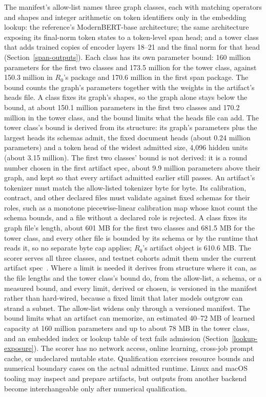 The manifest's allow-list names three graph classes, each with matching
operators and shapes and integer arithmetic on token identifiers only in the
embedding lookup: the reference's ModernBERT-base architecture; the same
architecture exposing its final-norm token states to a token-level span head;
and a tower class that adds trained copies of encoder layers 18--21 and the
final norm for that head (Section~\ref{span-outputs}). Each class has its own
parameter bound: 160 million parameters for the
first two classes and 173.5 million for the tower class, against 150.3 million
in \(R_0\)'s package and 170.6 million in the first span package. The bound
counts the graph's parameters together with the weights in the artifact's heads
file. A class fixes its graph's shapes, so the graph alone stays below the
bound, at about 150.1 million parameters in the first two classes and
170.2 million in the tower class, and the bound limits what the heads file can
add. The tower class's bound is derived from its structure: its graph's
parameters plus the largest heads its schemas admit, the fixed document heads
(about 0.24 million parameters) and a token head of the widest admitted size,
4,096 hidden units (about 3.15 million). The first two classes' bound is not
derived: it is a round number chosen in the first artifact spec, about
9.9 million parameters above their graph, and kept so that every artifact
admitted earlier still passes. An artifact's tokenizer
must match the allow-listed tokenizer byte for byte. Its calibration, contract,
and other declared files must validate against fixed schemas for their roles,
such as a monotone piecewise-linear calibration map whose knot count the schema
bounds, and a file without a declared role is rejected. A class fixes its graph
file's length, about 601 MB for the first two classes and 681.5 MB for the tower
class, and every other file is bounded by its schema or by the runtime that
reads it, so no separate byte cap applies; \(R_0\)'s artifact object is
610.6 MB. The scorer serves all three classes, and testnet cohorts admit them
under the current artifact spec~\cite{artifactspec}. Where a limit is needed it
derives from structure where it can, as the file lengths and the tower class's
bound do, from the allow-list, a schema, or a measured bound, and every limit,
derived or chosen, is versioned in the manifest rather than hard-wired, because
a fixed limit that later models outgrow can
strand a subnet. The allow-list widens only through a versioned manifest. The
bound limits what an artifact can memorize, an estimated 40--72 MB of learned
capacity at 160 million parameters and up to about 78 MB in the tower class,
and an embedded index or lookup table
of text fails admission (Section~\ref{lookup-exposure}). The scorer has no
network access, online learning, cross-job prompt cache, or undeclared mutable
state. Qualification exercises resource bounds and numerical
boundary cases on the actual admitted runtime. Linux and macOS tooling may
inspect and prepare artifacts, but outputs from another backend become
interchangeable only after numerical qualification.

